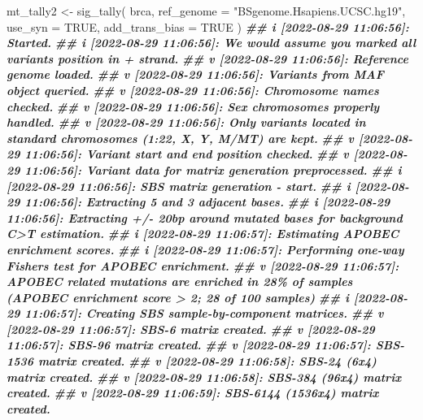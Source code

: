 \documentclass[
  12pt,
  a4paper,
  twoside]{book}
\newenvironment{Shaded}{\begin{snugshade}}{\end{snugshade}}
\newcommand{\AttributeTok}[1]{\textcolor[rgb]{0.77,0.63,0.00}{#1}}
\newcommand{\ConstantTok}[1]{\textcolor[rgb]{0.00,0.00,0.00}{#1}}
\newcommand{\DocumentationTok}[1]{\textcolor[rgb]{0.56,0.35,0.01}{\textbf{\textit{#1}}}}
\newcommand{\FunctionTok}[1]{\textcolor[rgb]{0.00,0.00,0.00}{#1}}
\newcommand{\NormalTok}[1]{#1}
\newcommand{\OtherTok}[1]{\textcolor[rgb]{0.56,0.35,0.01}{#1}}
\newcommand{\StringTok}[1]{\textcolor[rgb]{0.31,0.60,0.02}{#1}}
\begin{document}
\begin{Shaded}
\begin{Highlighting}[]
\NormalTok{mt\_tally2 }\OtherTok{\textless{}{-}} \FunctionTok{sig\_tally}\NormalTok{(}
\NormalTok{  brca,}
  \AttributeTok{ref\_genome =} \StringTok{"BSgenome.Hsapiens.UCSC.hg19"}\NormalTok{,}
  \AttributeTok{use\_syn =} \ConstantTok{TRUE}\NormalTok{, }\AttributeTok{add\_trans\_bias =} \ConstantTok{TRUE}
\NormalTok{)}
\DocumentationTok{\#\# i [2022{-}08{-}29 11:06:56]: Started.}
\DocumentationTok{\#\# i [2022{-}08{-}29 11:06:56]: We would assume you marked all variants\textquotesingle{} position in + strand.}
\DocumentationTok{\#\# v [2022{-}08{-}29 11:06:56]: Reference genome loaded.}
\DocumentationTok{\#\# v [2022{-}08{-}29 11:06:56]: Variants from MAF object queried.}
\DocumentationTok{\#\# v [2022{-}08{-}29 11:06:56]: Chromosome names checked.}
\DocumentationTok{\#\# v [2022{-}08{-}29 11:06:56]: Sex chromosomes properly handled.}
\DocumentationTok{\#\# v [2022{-}08{-}29 11:06:56]: Only variants located in standard chromosomes (1:22, X, Y, M/MT) are kept.}
\DocumentationTok{\#\# v [2022{-}08{-}29 11:06:56]: Variant start and end position checked.}
\DocumentationTok{\#\# v [2022{-}08{-}29 11:06:56]: Variant data for matrix generation preprocessed.}
\DocumentationTok{\#\# i [2022{-}08{-}29 11:06:56]: SBS matrix generation {-} start.}
\DocumentationTok{\#\# i [2022{-}08{-}29 11:06:56]: Extracting 5\textquotesingle{} and 3\textquotesingle{} adjacent bases.}
\DocumentationTok{\#\# i [2022{-}08{-}29 11:06:56]: Extracting +/{-} 20bp around mutated bases for background C\textgreater{}T estimation.}
\DocumentationTok{\#\# i [2022{-}08{-}29 11:06:57]: Estimating APOBEC enrichment scores.}
\DocumentationTok{\#\# i [2022{-}08{-}29 11:06:57]: Performing one{-}way Fisher\textquotesingle{}s test for APOBEC enrichment.}
\DocumentationTok{\#\# v [2022{-}08{-}29 11:06:57]: APOBEC related mutations are enriched in 28\% of samples (APOBEC enrichment score \textgreater{} 2; 28 of 100 samples)}
\DocumentationTok{\#\# i [2022{-}08{-}29 11:06:57]: Creating SBS sample{-}by{-}component matrices.}
\DocumentationTok{\#\# v [2022{-}08{-}29 11:06:57]: SBS{-}6 matrix created.}
\DocumentationTok{\#\# v [2022{-}08{-}29 11:06:57]: SBS{-}96 matrix created.}
\DocumentationTok{\#\# v [2022{-}08{-}29 11:06:57]: SBS{-}1536 matrix created.}
\DocumentationTok{\#\# v [2022{-}08{-}29 11:06:58]: SBS{-}24 (6x4) matrix created.}
\DocumentationTok{\#\# v [2022{-}08{-}29 11:06:58]: SBS{-}384 (96x4) matrix created.}
\DocumentationTok{\#\# v [2022{-}08{-}29 11:06:59]: SBS{-}6144 (1536x4) matrix created.}

\end{Highlighting}
\end{Shaded}
\end{document}
